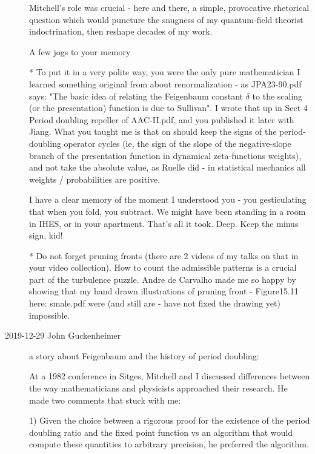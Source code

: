 \begin{description}
Mitchell's role was crucial - here and there, a simple, provocative
rhetorical question which would puncture the snugness of my quantum-field
theorist indoctrination, then reshape decades of my work.

A few jogs to your memory

* To put it in a very polite way, you were the only pure mathematician I
learned something original from about renormalization - as
 {JPA23-90.pdf}
says: "The basic idea of relating the Feigenbaum constant $\delta$ to the
scaling (or the presentation) function is due to Sullivan". I wrote that
up in Sect 4 Period doubling repeller of
 {AAC-II.pdf}, and
you published it later with Jiang. What you taught me is that on should
keep the signs of the period-doubling operator cycles (ie, the sign of
the slope of the negative-slope branch of the presentation function in
dynamical zeta-functions weights), and not take the absolute value, as
Ruelle did - in statistical mechanics all weights / probabilities are
positive.

I have a clear memory of the moment I understood you - you gesticulating
that when you fold, you subtract. We might have been standing in a room
in IHES, or in your apartment. That's all it took. Deep. Keep the minus
sign, kid!

* Do not forget pruning fronts (there are 2 videos of my talks on that in
your video collection). How to count the admissible patterns is a crucial
part of the turbulence puzzle. Andre de Carvalho made me so happy by
showing that my hand drawn illustrations of pruning front -  Figure15.11
here:  {smale.pdf} were
(and still are - have not fixed the drawing yet) impossible.

\item[2019-12-29 John Guckenheimer]  %
a story about Feigenbaum and the history of period doubling:

At a 1982 conference in Sitges, Mitchell and I discussed differences
between the way mathematicians and physicists approached their research.
He made two comments that stuck with me:

1) Given the choice between a rigorous proof for the existence of the
period doubling ratio and the fixed point function vs an algorithm that
would compute these quantities to arbitrary precision, he preferred the
algorithm.


\end{description}
